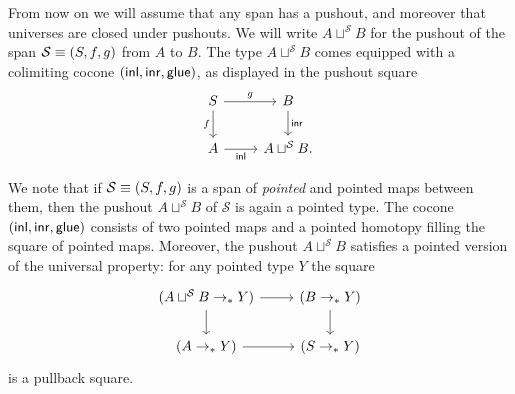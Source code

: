 \begin{defn}
From now on we will assume that any span has a pushout, and moreover that universes are closed under pushouts. We will write $A\sqcup^{\mathcal{S}} B$ for the pushout of the span $\mathcal{S}\equiv(S,f,g)$ from $A$ to $B$. The type $A\sqcup^{\mathcal{S}} B$ comes equipped with a colimiting cocone $({\mathsf{inl}},{\mathsf{inr}},\mathsf{glue})$, as displayed in the pushout square
\begin{equation*}
\begin{tikzcd}
S \arrow[d,swap,"f"] \arrow[r,"g"] & B \arrow[d,"\inr"] \\
A \arrow[r,swap,"\inl"] & A \sqcup^{\mathcal{S}} B.
\end{tikzcd}
\end{equation*}
\end{defn}

\begin{rmk}
We note that if $\mathcal{S}\equiv (S,f,g)$ is a span of \emph{pointed} and pointed maps between them, then the pushout $A\sqcup^{\mathcal{S}} B$ of $\mathcal{S}$ is again a pointed type. The cocone $({\mathsf{inl}},{\mathsf{inr}},\mathsf{glue})$ consists of two pointed maps and a pointed homotopy filling the square of pointed maps. Moreover, the pushout $A\sqcup^{\mathcal{S}} B$ satisfies a pointed version of the universal property: for any pointed type $Y$ the square
\begin{equation*}
\begin{tikzcd}
(A\sqcup^{\mathcal{S}} B \to_\ast Y) \arrow[r] \arrow[d] & (B\to_\ast Y) \arrow[d] \\
(A\to_\ast Y) \arrow[r] & (S\to_\ast Y)
\end{tikzcd}
\end{equation*}
is a pullback square. 
\end{rmk}

\begin{comment}
\begin{proof}
It is straightforward to verify that the triangle
\begin{equation*}
\begin{tikzcd}
\phantom{T^A \times_{T^S} T^B} & T^X \arrow[dl,swap,"{\mathsf{cocone\usc{}map}(i,j,H)}"] \arrow[dr,"{\mathsf{gap}(\blank\circ i,\blank\circ j, \mathsf{eq\usc{}htpy}(\blank\cdot H))}"] & \phantom{\mathsf{cocone}(T)} \\
\mathsf{cocone}(T) \arrow[rr,swap,"{\mathsf{gap}(i,j,\mathsf{eq\usc{}htpy}(H))}"] & & T^A \times_{T^S} T^B
\end{tikzcd}
\end{equation*}
commutes. Since the bottom map is an equivalence by \cref{lem:cocone_pb}, it follows that if either one of the remaining maps is an equivalence, so is the other. The claim now follows by \cref{thm:is_pullback}.
\end{proof}
\end{comment}

